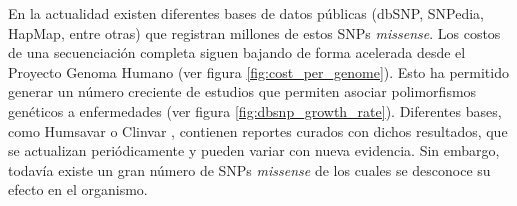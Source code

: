 En la actualidad existen diferentes bases de datos públicas (dbSNP, SNPedia, HapMap, entre otras) que registran millones de estos SNPs \textit{missense}. Los costos de una secuenciación completa siguen bajando de forma acelerada desde el Proyecto Genoma Humano \cite{sequencingcost} (ver figura \ref{fig:cost_per_genome}). Esto ha permitido generar un número creciente de estudios que permiten asociar polimorfismos genéticos a enfermedades (ver figura \ref{fig:dbsnp_growth_rate}). Diferentes bases, como Humsavar \cite{humsavar} o Clinvar \cite{clinvar}, contienen reportes curados con dichos resultados, que se actualizan periódicamente y pueden variar con nueva evidencia. Sin embargo, todavía existe un gran número de SNPs \textit{missense} de los cuales se desconoce su efecto en el organismo. 

